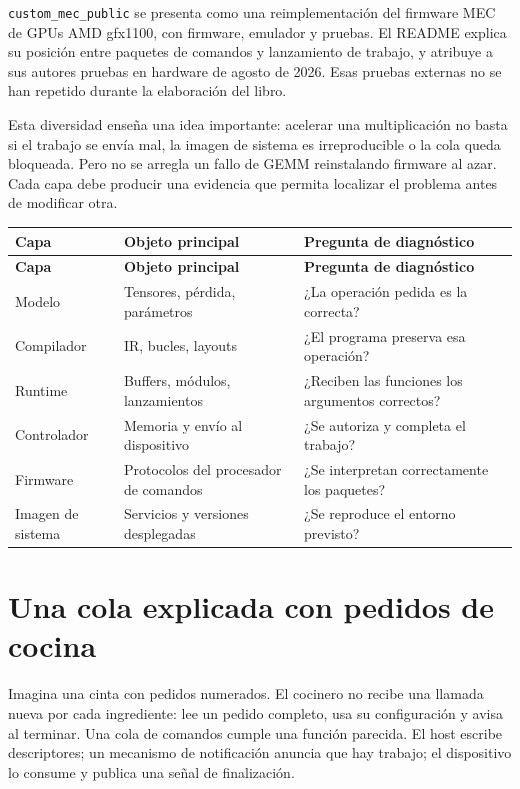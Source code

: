 \documentclass[12pt,a4paper,oneside]{report}
\begin{document}
\texttt{custom\_mec\_public} se presenta como una reimplementación del firmware MEC de GPUs AMD gfx1100, con firmware, emulador y pruebas. El README explica su posición entre paquetes de comandos y lanzamiento de trabajo, y atribuye a sus autores pruebas en hardware de agosto de 2026. Esas pruebas externas no se han repetido durante la elaboración del libro. \cite{tiny-mec}

Esta diversidad enseña una idea importante: acelerar una multiplicación no basta si el trabajo se envía mal, la imagen de sistema es irreproducible o la cola queda bloqueada. Pero no se arregla un fallo de GEMM reinstalando firmware al azar. Cada capa debe producir una evidencia que permita localizar el problema antes de modificar otra.

{\small
\begin{longtable}{@{}P{0.28\textwidth}P{0.32\textwidth}P{0.34\textwidth}@{}}
\toprule
\textbf{Capa} & \textbf{Objeto principal} & \textbf{Pregunta de diagnóstico}\\
\midrule
\endfirsthead
\toprule
\textbf{Capa} & \textbf{Objeto principal} & \textbf{Pregunta de diagnóstico}\\
\midrule
\endhead
Modelo & Tensores, pérdida, parámetros & ¿La operación pedida es la correcta?\\
Compilador & IR, bucles, layouts & ¿El programa preserva esa operación?\\
Runtime & Buffers, módulos, lanzamientos & ¿Reciben las funciones los argumentos correctos?\\
Controlador & Memoria y envío al dispositivo & ¿Se autoriza y completa el trabajo?\\
Firmware & Protocolos del procesador de comandos & ¿Se interpretan correctamente los paquetes?\\
Imagen de sistema & Servicios y versiones desplegadas & ¿Se reproduce el entorno previsto?\\
\bottomrule
\end{longtable}
}
\section{Una cola explicada con pedidos de cocina}
Imagina una cinta con pedidos numerados. El cocinero no recibe una llamada nueva por cada ingrediente: lee un pedido completo, usa su configuración y avisa al terminar. Una cola de comandos cumple una función parecida. El host escribe descriptores; un mecanismo de notificación anuncia que hay trabajo; el dispositivo lo consume y publica una señal de finalización.
\end{document}
